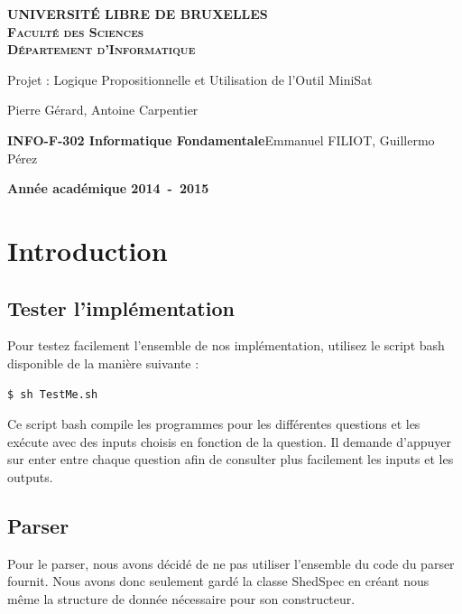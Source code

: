 \documentclass[a4paper,11pt]{article}
\begin{document}
\begin{titlepage}
\begin{center}
\textbf{\textsc{UNIVERSIT\'E LIBRE DE BRUXELLES}}\\
\textbf{\textsc{Faculté des Sciences}}\\
\textbf{\textsc{Département d'Informatique}}
\vfill{}\vfill{}
\begin{center}{\Huge Projet : Logique Propositionnelle et Utilisation de l’Outil MiniSat}\end{center}{\Huge \par}
\begin{center}{\large Pierre Gérard, Antoine Carpentier}\end{center}{\Huge \par}
\vfill{}\vfill{} \vfill{}
\begin{flushleft}{\large \textbf{INFO-F-302 Informatique Fondamentale}}\hfill{Emmanuel FILIOT, Guillermo Pérez}\end{flushleft}{\large\par}
\vfill{}\vfill{}\enlargethispage{3cm}
\textbf{Année académique 2014~-~2015}
\end{center}
\end{titlepage}



\tableofcontents

\pagebreak

\section{Introduction}

\subsection{Tester l'implémentation}
Pour testez facilement l'ensemble de nos implémentation, utilisez le script bash disponible de la manière suivante :
\begin{lstlisting}
$ sh TestMe.sh	
\end{lstlisting}
Ce script bash compile les programmes pour les différentes questions et les exécute avec des inputs choisis en fonction de la question. Il demande d'appuyer sur enter entre chaque question afin de consulter plus facilement les inputs et les outputs.

\subsection{Parser}
Pour le parser, nous avons décidé de ne pas utiliser l'ensemble du code du parser fournit. Nous avons donc seulement gardé la classe ShedSpec en créant nous même la structure de donnée nécessaire pour son constructeur.
\end{document}
